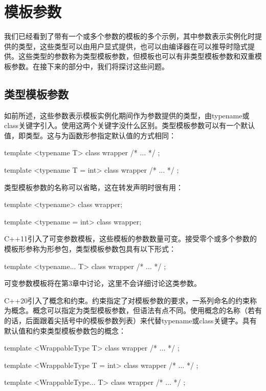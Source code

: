 \section{模板参数}

我们已经看到了带有一个或多个参数的模板的多个示例，其中参数表示实例化时提供的类型，这些类型可以由用户显式提供，也可以由编译器在可以推导时隐式提供。这些类型的参数称为类型模板参数，但模板也可以有非类型模板参数和双重模板参数。在接下来的部分中，我们将探讨这些问题。

\subsection{类型模板参数}

如前所述，这些参数表示模板实例化期间作为参数提供的类型，由typename或class关键字引入。使用这两个关键字没什么区别。类型模板参数可以有一个默认值，即类型。这与为函数形参指定默认值的方式相同：

\begin{cppcode}
template <typename T>
class wrapper { /* ... */ };

template <typename T = int>
class wrapper { /* ... */ };
\end{cppcode}

类型模板参数的名称可以省略，这在转发声明时很有用：

\begin{cppcode}
template <typename>
class wrapper;

template <typename = int>
class wrapper;
\end{cppcode}

C++11引入了可变参数模板，这些模板的参数数量可变。接受零个或多个参数的模板形参称为形参包，类型模板参数包具有以下形式：

\begin{cppcode}
template <typename... T>
class wrapper { /* ... */ };
\end{cppcode}

可变参数模板将在第3章中讨论，这里不会详细讨论这类参数。

C++20引入了概念和约束。约束指定了对模板参数的要求，一系列命名的约束称为概念。概念可以指定为类型模板参数，但语法有点不同。使用概念的名称（若有的话，后面跟着尖括号中的模板参数列表）来代替typename或class关键字。具有默认值和约束类型模板参数包的概念：

\begin{cppcode}
template <WrappableType T>
class wrapper { /* ... */ };

template <WrappableType T = int>
class wrapper { /* ... */ };

template <WrappableType... T>
class wrapper { /* ... */ };
\end{cppcode}

